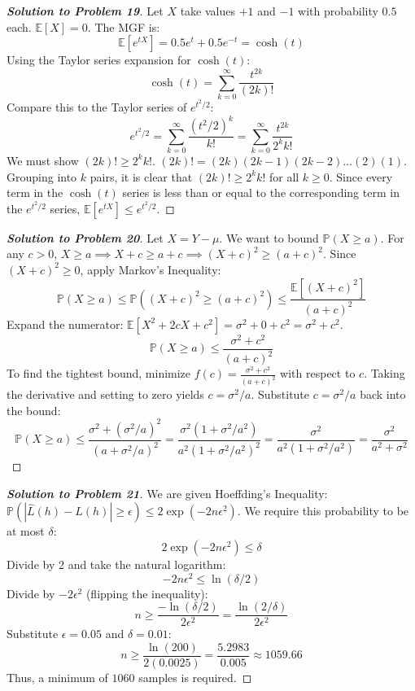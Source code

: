 \documentclass[11pt, a4paper]{article}
\theoremstyle{definition}
\theoremstyle{remark}
\newcommand{\E}{\mathbb{E}}
\newcommand{\Prob}{\mathbb{P}}
\begin{document}
\begin{proof}[\textbf{Solution to Problem 19}]
Let $X$ take values $+1$ and $-1$ with probability $0.5$ each. $\E[X] = 0$.
The MGF is:
\[ \E[e^{tX}] = 0.5e^t + 0.5e^{-t} = \cosh(t) \]
Using the Taylor series expansion for $\cosh(t)$:
\[ \cosh(t) = \sum_{k=0}^{\infty} \frac{t^{2k}}{(2k)!} \]
Compare this to the Taylor series of $e^{t^2/2}$:
\[ e^{t^2/2} = \sum_{k=0}^{\infty} \frac{(t^2/2)^k}{k!} = \sum_{k=0}^{\infty} \frac{t^{2k}}{2^k k!} \]
We must show $(2k)! \ge 2^k k!$.
$(2k)! = (2k)(2k-1)(2k-2)\dots(2)(1)$. Grouping into $k$ pairs, it is clear that $(2k)! \ge 2^k k!$ for all $k \ge 0$.
Since every term in the $\cosh(t)$ series is less than or equal to the corresponding term in the $e^{t^2/2}$ series, $\E[e^{tX}] \le e^{t^2/2}$.
\end{proof}

\begin{proof}[\textbf{Solution to Problem 20}]
Let $X = Y - \mu$. We want to bound $\Prob(X \ge a)$.
For any $c > 0$, $X \ge a \implies X + c \ge a + c \implies (X+c)^2 \ge (a+c)^2$.
Since $(X+c)^2 \ge 0$, apply Markov's Inequality:
\[ \Prob(X \ge a) \le \Prob((X+c)^2 \ge (a+c)^2) \le \frac{\E[(X+c)^2]}{(a+c)^2} \]
Expand the numerator: $\E[X^2 + 2cX + c^2] = \sigma^2 + 0 + c^2 = \sigma^2 + c^2$.
\[ \Prob(X \ge a) \le \frac{\sigma^2 + c^2}{(a+c)^2} \]
To find the tightest bound, minimize $f(c) = \frac{\sigma^2 + c^2}{(a+c)^2}$ with respect to $c$.
Taking the derivative and setting to zero yields $c = \sigma^2 / a$.
Substitute $c = \sigma^2 / a$ back into the bound:
\[ \Prob(X \ge a) \le \frac{\sigma^2 + (\sigma^2/a)^2}{(a + \sigma^2/a)^2} = \frac{\sigma^2(1 + \sigma^2/a^2)}{a^2(1 + \sigma^2/a^2)^2} = \frac{\sigma^2}{a^2(1 + \sigma^2/a^2)} = \frac{\sigma^2}{a^2 + \sigma^2} \]
\end{proof}

\begin{proof}[\textbf{Solution to Problem 21}]
We are given Hoeffding's Inequality: $\Prob(|\hat{L}(h) - L(h)| \ge \epsilon) \le 2\exp(-2n\epsilon^2)$.
We require this probability to be at most $\delta$:
\[ 2\exp(-2n\epsilon^2) \le \delta \]
Divide by 2 and take the natural logarithm:
\[ -2n\epsilon^2 \le \ln(\delta/2) \]
Divide by $-2\epsilon^2$ (flipping the inequality):
\[ n \ge \frac{-\ln(\delta/2)}{2\epsilon^2} = \frac{\ln(2/\delta)}{2\epsilon^2} \]
Substitute $\epsilon = 0.05$ and $\delta = 0.01$:
\[ n \ge \frac{\ln(200)}{2(0.0025)} = \frac{5.2983}{0.005} \approx 1059.66 \]
Thus, a minimum of $1060$ samples is required.
\end{proof}
\end{document}
